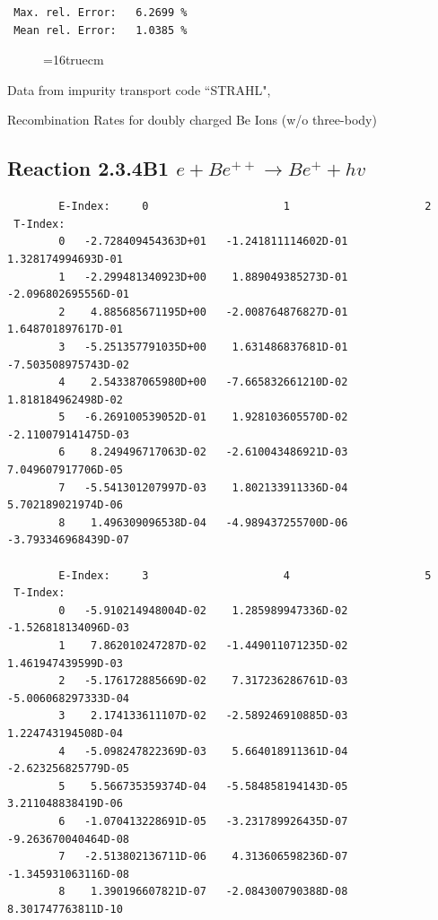 \documentclass[12pt,dvipdfmx]{article}
\begin{document}
\begin{small}
\begin{verbatim}
 Max. rel. Error:   6.2699 %
 Mean rel. Error:   1.0385 %

\end{verbatim}\end{small}
\begin{figure} \label{2.3.4B0}
\epsfxsize=16truecm
\end{figure}
\newpage
Data from impurity transport code ``STRAHL", \cite{kn:Behringer}

  Recombination Rates for doubly charged Be Ions (w/o three-body)
\subsection{
Reaction 2.3.4B1  $e + Be^{++} \rightarrow Be^+ + hv$
}

\begin{small}\begin{verbatim}
        E-Index:     0                     1                     2
 T-Index:
        0   -2.728409454363D+01   -1.241811114602D-01    1.328174994693D-01
        1   -2.299481340923D+00    1.889049385273D-01   -2.096802695556D-01
        2    4.885685671195D+00   -2.008764876827D-01    1.648701897617D-01
        3   -5.251357791035D+00    1.631486837681D-01   -7.503508975743D-02
        4    2.543387065980D+00   -7.665832661210D-02    1.818184962498D-02
        5   -6.269100539052D-01    1.928103605570D-02   -2.110079141475D-03
        6    8.249496717063D-02   -2.610043486921D-03    7.049607917706D-05
        7   -5.541301207997D-03    1.802133911336D-04    5.702189021974D-06
        8    1.496309096538D-04   -4.989437255700D-06   -3.793346968439D-07

        E-Index:     3                     4                     5
 T-Index:
        0   -5.910214948004D-02    1.285989947336D-02   -1.526818134096D-03
        1    7.862010247287D-02   -1.449011071235D-02    1.461947439599D-03
        2   -5.176172885669D-02    7.317236286761D-03   -5.006068297333D-04
        3    2.174133611107D-02   -2.589246910885D-03    1.224743194508D-04
        4   -5.098247822369D-03    5.664018911361D-04   -2.623256825779D-05
        5    5.566735359374D-04   -5.584858194143D-05    3.211048838419D-06
        6   -1.070413228691D-05   -3.231789926435D-07   -9.263670040464D-08
        7   -2.513802136711D-06    4.313606598236D-07   -1.345931063116D-08
        8    1.390196607821D-07   -2.084300790388D-08    8.301747763811D-10


\end{verbatim}
\end{small}
\end{document}
